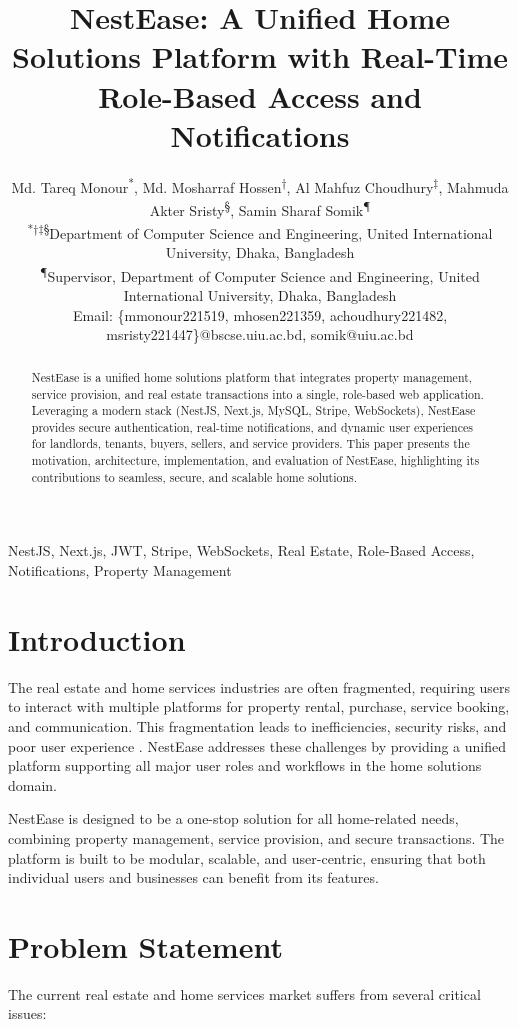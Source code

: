 \documentclass[conference]{IEEEtran}
\title{NestEase: A Unified Home Solutions Platform with Real-Time Role-Based Access and Notifications}
\author{
Md. Tareq Monour\textsuperscript{*}, Md. Mosharraf Hossen\textsuperscript{†}, Al Mahfuz Choudhury\textsuperscript{‡}, Mahmuda Akter Sristy\textsuperscript{§}, Samin Sharaf Somik\textsuperscript{¶} \\
\textsuperscript{*†‡§}Department of Computer Science and Engineering, United International University, Dhaka, Bangladesh \\
\textsuperscript{¶}Supervisor, Department of Computer Science and Engineering, United International University, Dhaka, Bangladesh \\
Email: \{mmonour221519, mhosen221359, achoudhury221482, msristy221447\}@bscse.uiu.ac.bd, somik@uiu.ac.bd
}
\begin{document}
\maketitle

\begin{abstract}
NestEase is a unified home solutions platform that integrates property management, service provision, and real estate transactions into a single, role-based web application. Leveraging a modern stack (NestJS, Next.js, MySQL, Stripe, WebSockets), NestEase provides secure authentication, real-time notifications, and dynamic user experiences for landlords, tenants, buyers, sellers, and service providers. This paper presents the motivation, architecture, implementation, and evaluation of NestEase, highlighting its contributions to seamless, secure, and scalable home solutions.
\end{abstract}

\begin{IEEEkeywords}
NestJS, Next.js, JWT, Stripe, WebSockets, Real Estate, Role-Based Access, Notifications, Property Management
\end{IEEEkeywords}

\section{Introduction}
The real estate and home services industries are often fragmented, requiring users to interact with multiple platforms for property rental, purchase, service booking, and communication. This fragmentation leads to inefficiencies, security risks, and poor user experience \cite{real_estate_platforms}. NestEase addresses these challenges by providing a unified platform supporting all major user roles and workflows in the home solutions domain.

NestEase is designed to be a one-stop solution for all home-related needs, combining property management, service provision, and secure transactions. The platform is built to be modular, scalable, and user-centric, ensuring that both individual users and businesses can benefit from its features.

\section{Problem Statement}
The current real estate and home services market suffers from several critical issues:
\end{document}
